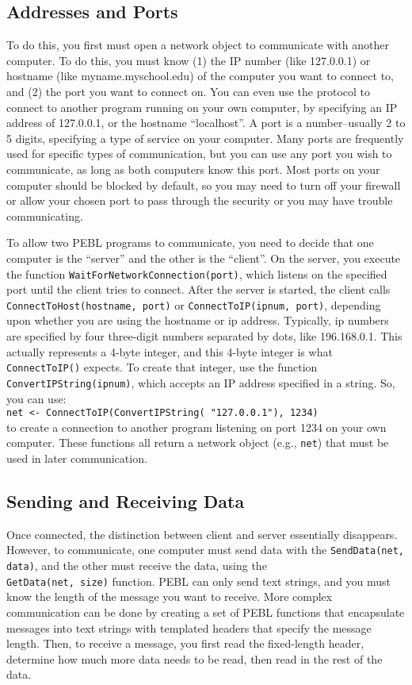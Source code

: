\subsection{Addresses and Ports}
To do this, you first must open a network object to communicate with
another computer.  To do this, you must know (1) the IP number (like
127.0.0.1) or hostname (like myname.myschool.edu) of the computer you
want to connect to, and (2) the port you want to connect on. You can even
use the protocol to connect to another program running on your own
computer, by specifying an IP address of 127.0.0.1, or the hostname
``localhost''.  A port is
a number--usually 2 to 5 digits, specifying a type of service
on your computer. Many ports are frequently used for specific types of
communication, but you can use any port you wish to communicate, as
long as both computers know this port. Most ports on your computer
should be blocked by default, so you may need to turn off your
firewall or allow your chosen port to pass through the security or you
may have trouble communicating.

To allow two PEBL programs to communicate, you need to decide that one
computer is the ``server'' and the other is the ``client''.  On the
server, you execute the function
\texttt{WaitForNetworkConnection(port)}, which listens on the
specified port until the client tries to connect.  After the server is
started, the client calls \texttt{ConnectToHost(hostname, port)} or
\texttt{ConnectToIP(ipnum, port)}, depending upon whether you are using the
hostname or ip address.  Typically, ip numbers are specified by four
three-digit numbers separated by dots, like 196.168.0.1. This actually
represents a 4-byte integer, and this 4-byte integer is what
\texttt{ConnectToIP()} expects.  To create that integer, use the
function \\ \texttt{ConvertIPString(ipnum)}, which accepts an IP address
specified in a string.  So, you can use:\\
\texttt{net <- ConnectToIP(ConvertIPString( "127.0.0.1"), 1234)}\\
to create a
connection to another program listening on port 1234 on your own
computer.  These functions all return a network object (e.g.,
\texttt{net}) that must be
used in later communication.

\subsection{Sending and Receiving Data}
Once connected, the distinction between client and server essentially
disappears.  However, to communicate, one computer must send data with
the \texttt{SendData(net, data)}, and the other must receive the
data, using the \\\texttt{GetData(net, size)} function.  PEBL can
only send text strings, and you must know the length of the message
you want to receive.  More complex communication can be done by
creating a set of PEBL functions that encapsulate messages into text
strings with templated headers that specify the message length.  Then,
to receive a message, you first read the fixed-length header,
determine how much more data needs to be read, then read in the rest
of the data. 



